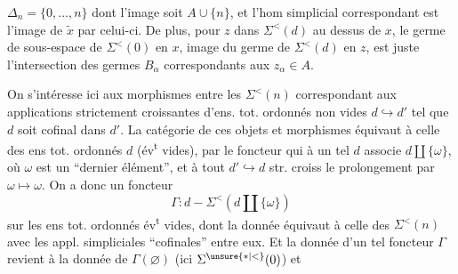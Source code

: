 $\Delta_n=\{0,\ldots,n\}$ dont l'image soit $A\cup\{n\}$, et l'hom simplicial correspondant
est l'image de $\widetilde x$ par celui-ci. De plus, pour $z$ dans  $\Sigma^{<}(d)$ au dessus de $x$,  le germe de sous-espace de $\Sigma^{<}(0)$ en $x$, image du germe de $\Sigma^{<}(d)$ en $z$, est juste l'intersection des germes $B_\alpha$ correspondants aux $z_\alpha\in A$.

On s'intéresse ici aux morphismes entre les $\Sigma^{<}(n)$ correspondant aux applications strictement croissantes d'ens. tot. ordonnés non vides $d\hookrightarrow d'$ tel que $d$ soit cofinal dans $d'$. La catégorie de ces objets et morphismes équivaut à celle des ens tot. ordonnés $d$ (év\textsuperscript{t} vides), par le foncteur qui à un tel $d$ associe $d\coprod\{\omega\}$, où $\omega$ est un ``dernier élément'', et à tout $d'\hookrightarrow d$ str. croiss le prolongement par $\omega\mapsto\omega$. On a donc \deleted{\unsure{$\Sigma$}} un foncteur
\[
\Gamma:d-\Sigma^{<}(d\coprod\{\omega\})
\]
sur les ens tot. ordonnés év\textsuperscript{t} vides, dont la donnée équivaut  à celle des $\Sigma^{<}(n)$ avec les appl. simpliciales ``cofinales'' entre eux. Et la donnée d'un  tel foncteur $\Gamma$ revient à la donnée de $\Gamma(\varnothing)$ (ici $\Sigma^{\unsure{*|<}}(0)$) et
